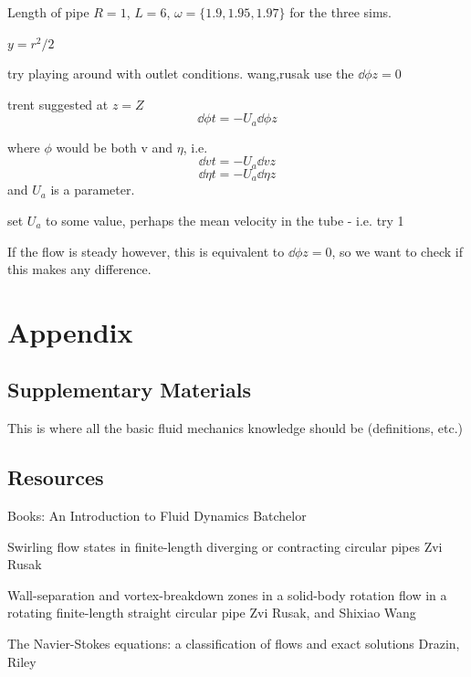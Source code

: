 \documentclass{X:/Documents/Coding/Latex/myreport}
\begin{document}
Length of pipe $R=1$, $L=6$, $\omega = \{1.9,1.95,1.97\}$ for the three sims.

$y = r^2/2$

try playing around with outlet conditions. wang,rusak use the $\dd \phi z = 0$

trent suggested at $z=Z$
\[\dd \phi t = -U_{a} \dd \phi z\]

where $\phi$ would be both v and $\eta$, i.e.
\[\dd vt = - U_{a} \dd v z\]
\[\dd\eta t = - U_{a} \dd \eta z\]
and $U_a$ is a parameter.

set $U_a$ to some value, perhaps the mean velocity in the tube - i.e. try 1

If the flow is steady however, this is equivalent to $\dd \phi z = 0$, so we want to check if this makes any difference.







\clearpage
\section{Appendix}
\subsection{Supplementary Materials}
This is where all the basic fluid mechanics knowledge should be (definitions, etc.)

\subsection{Resources}
Books:
An Introduction to Fluid Dynamics
Batchelor

Swirling flow states in finite-length diverging or contracting circular pipes
Zvi Rusak


Wall-separation and vortex-breakdown zones in a solid-body rotation flow in a rotating finite-length straight circular pipe
Zvi Rusak, and Shixiao Wang

The Navier-Stokes equations: a classification of flows and exact solutions
Drazin, Riley
\end{document}
